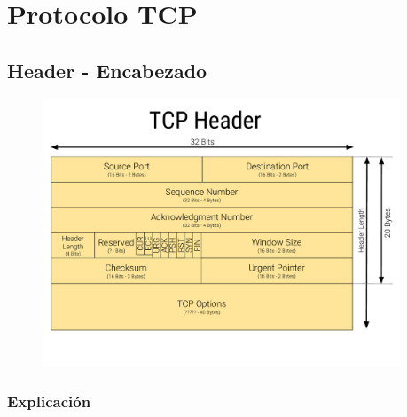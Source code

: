 \documentclass[12pt, fleqn]{report}                             %
\theoremstyle{break}                                            %
\begin{document}
    \clearpage
    \chapter{Protocolo TCP}



        \clearpage
        \section{Header - Encabezado}

            \begin{figure}[h]
                \centering
                \includegraphics[width=0.95\textwidth]{TCP-Header}
            \end{figure}

            \clearpage
            \subsection{Explicación}
\end{document}
